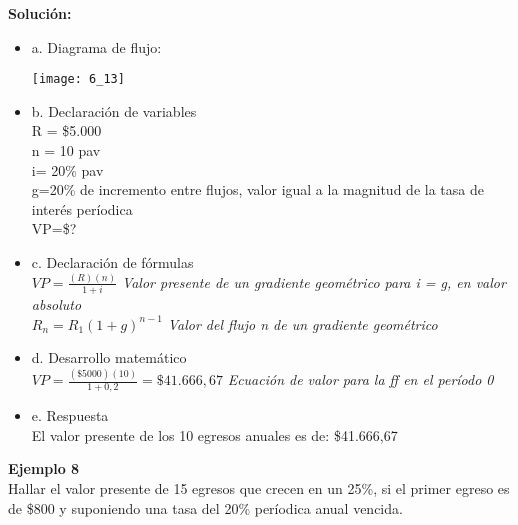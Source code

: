 	\textbf{Solución:}
	\begin{itemize}
		\item a. Diagrama de flujo:
		\begin{center}
			\texttt{[image: 6\_13]}
		\end{center}
		\item b. Declaración de variables\\
		R = \$5.000\\ n = 10 pav\\ i= 20\% pav\\ g=20\% de incremento entre flujos, valor igual a la magnitud de la tasa de interés períodica\\ VP=\$?\\
		\item c. Declaración de fórmulas\\
		$VP = \frac{(R)(n)}{1+i}$ \hspace{35 pt} \textit{Valor presente de un gradiente geométrico para i = g, en valor absoluto}\\
		$R_{n} = R_{1}(1+g)^{n-1}$ \hspace{35 pt} \textit{Valor del flujo n de un gradiente geométrico}\\
		\item d. Desarrollo matemático\\
		$VP = \frac{(\$5000)(10)}{1+0,2} = \$41.666,67$ \hspace{35 pt} \textit{Ecuación de valor para la ff en el período 0}\\
		\item e. Respuesta\\
		El valor presente de los 10 egresos anuales es de: \$41.666,67 \\		
	\end{itemize}
	
	\textbf{Ejemplo 8}\\
	Hallar el valor presente de 15 egresos que crecen en un 25\%, si el primer egreso es de \$800 y suponiendo una tasa del 20\% períodica anual vencida.\\
	
